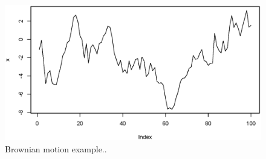 \documentclass[11pt]{book}\usepackage[]{graphicx}\usepackage[]{color}
\makeatletter
\def\maxwidth{ %
  \ifdim\Gin@nat@width>\linewidth
    \linewidth
  \else
    \Gin@nat@width
  \fi
}
\newenvironment{knitrout}{}{} %
\makeatother
\begin{document}

\begin{figure}[H]
\begin{center}
\begin{knitrout}
\color{fgcolor}
\includegraphics[width=\maxwidth]{knitr-cache/unnamed-chunk-4-1} 

\end{knitrout}
\end{center}
\caption{Brownian motion example..}
\label{fig:example-brownian-motion}
\end{figure}
\end{document}
